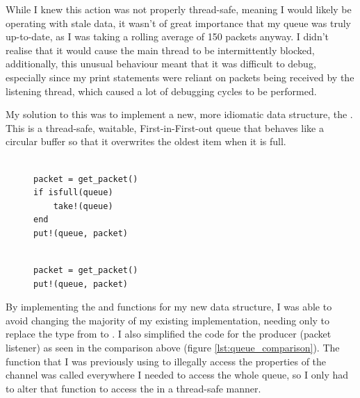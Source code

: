 While I knew this action was not properly thread-safe, meaning I would likely be operating with stale data, it wasn't of great importance that my queue was truly up-to-date, as I was taking a rolling average of 150 packets anyway. I didn't realise that it would cause the main thread to be intermittently blocked, additionally, this unusual behaviour meant that it was difficult to debug, especially since my print statements were reliant on packets being received by the listening thread, which caused a lot of debugging cycles to be performed.

My solution to this was to implement a new, more idiomatic data structure, the . This is a thread-safe, waitable, First-in-First-out queue that behaves like a circular buffer so that it overwrites the oldest item when it is full.

\begin{figure}[!h]
    \begin{minipage}{0.5\textwidth}
        \centering
        \begin{verbatim}

packet = get_packet()
if isfull(queue)
    take!(queue)
end
put!(queue, packet)

        \end{verbatim}
    \end{minipage}
    \begin{minipage}{0.5\textwidth}
        \centering
        \begin{verbatim}

packet = get_packet()
put!(queue, packet)

        \end{verbatim}
    \end{minipage}
\end{figure}
\label{lst:queue_comparison}

By implementing the  and  functions for my new data structure, I was able to avoid changing the majority of my existing implementation, needing only to replace the type from  to . I also simplified the code for the producer (packet listener) as seen in the comparison above (figure \ref{lst:queue_comparison}). The  function that I was previously using to illegally access the properties of the channel was called everywhere I needed to access the whole queue, so I only had to alter that function to access the  in a thread-safe manner. 

